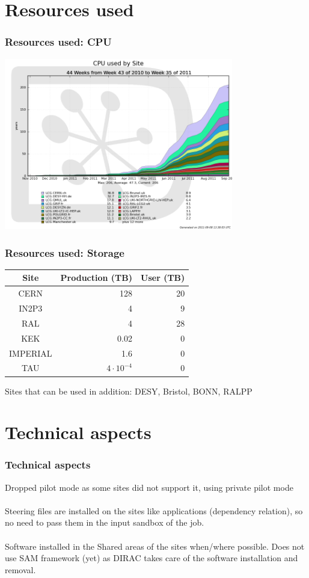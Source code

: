 \documentclass{beamer}
\begin{document}
\section{Resources used}
\begin{frame}
\frametitle{Resources used: CPU}
 \includegraphics[width=10cm]{CPUperSiteForProd}
\end{frame}
\begin{frame}
\frametitle{Resources used: Storage} 
\begin{center}
\begin{tabular}{crr}
\toprule
Site & Production (TB) & User (TB) \\
\midrule
CERN & 128 & 20\\
IN2P3 & 4 & 9\\
RAL & 4 & 28\\
KEK & 0.02 & 0\\
IMPERIAL& 1.6 & 0 \\
TAU & $4\cdot 10^{-4}$ & 0\\
\bottomrule
\end{tabular}
\end{center}
Sites that can be used in addition: DESY, Bristol, BONN, RALPP
\end{frame}
\section{Technical aspects}
\begin{frame}
\frametitle{Technical aspects}
Dropped pilot mode as some sites did not support it, using private pilot mode\\
~\\
Steering files are installed on the sites like applications (dependency relation), so no need to pass them in the input sandbox of the job.\\
~\\
Software installed in the Shared areas of the sites when/where possible. Does not use SAM framework (yet) as DIRAC takes care of the software installation and removal. 
\end{frame}
\end{document}
